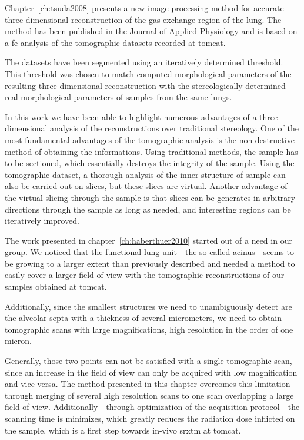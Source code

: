 Chapter~\ref{ch:tsuda2008} presents a new image processing method for accurate three-dimensional reconstruction of the gas exchange region of the lung. The method has been  published in the \href{http://jap.physiology.org/}{Journal of Applied Physiology} and is based on a \ac{fe} analysis of the tomographic datasets recorded at \ac{tomcat}. 

The datasets have been segmented using an iteratively determined threshold. This threshold was chosen to match computed morphological parameters of the resulting three-dimensional reconstruction with the stereologically determined real morphological parameters of samples from the same lungs.

In this work we have been able to highlight numerous advantages of a three-dimensional analysis of the reconstructions over traditional stereology. One of the most fundamental advantages of the tomographic analysis is the non-destructive method of obtaining the informations. Using traditional methods, the sample has to be sectioned, which essentially destroys the integrity of the sample. Using the tomographic dataset, a thorough analysis of the inner structure of sample can also be carried out on slices, but these slices are virtual. Another advantage of the virtual slicing through the sample is that slices can be generates in arbitrary directions through the sample as long as needed, and interesting regions can be iteratively improved.

The work presented in chapter~\ref{ch:haberthuer2010} started out of a need in our group. We noticed that the functional lung unit---the so-called acinus---seems to be growing to a larger extent than previously described  and needed a method to easily cover a larger field of view with the tomographic reconstructions of our samples obtained at \ac{tomcat}. 

Additionally, since the smallest structures we need to unambiguously detect are the alveolar septa with a thickness of several micrometers, we need to obtain tomographic scans with large magnifications, \ie high resolution in the order of one micron. 

Generally, those two points can not be satisfied with a single tomographic scan, since an increase in the field of view can only be acquired with low magnification and vice-versa. The method presented in this chapter overcomes this limitation through merging of several high resolution scans to one scan overlapping a large field of view. Additionally---through optimization of the acquisition protocol---the scanning time is minimizes, which greatly reduces the radiation dose inflicted on the sample, which is a first step towards in-vivo \ac{srxtm} at \ac{tomcat}.


